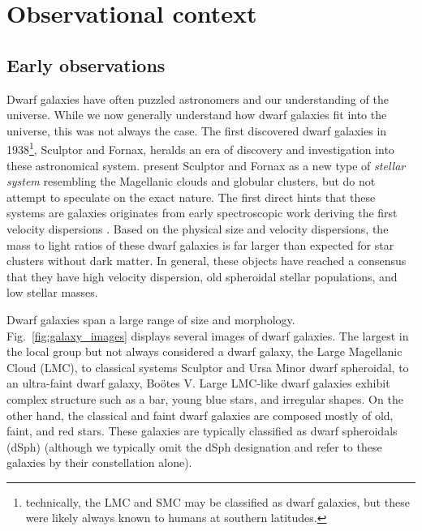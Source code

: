 \section{Observational context}\label{observational-context}

\subsection{Early observations}\label{early-observations}

Dwarf galaxies have often puzzled astronomers and our understanding of
the universe. While we now generally understand how dwarf galaxies fit
into the universe, this was not always the case. The first discovered
dwarf galaxies in 1938\footnote{technically, the LMC and SMC may be
  classified as dwarf galaxies, but these were likely always known to
  humans at southern latitudes.}, Sculptor and Fornax, heralds an era of
discovery and investigation into these astronomical system.
\citet{shapley1938} present Sculptor and Fornax as a new type of
\emph{stellar system} resembling the Magellanic clouds and globular
clusters, but do not attempt to speculate on the exact nature. The first
direct hints that these systems are galaxies originates from early
spectroscopic work deriving the first velocity dispersions
\citep[e.g.,][\citet{gallagher+wyse1994}, \citet{mateo1994},
\citet{pryor1994}, \citet{pryor1996}, \citet{gerhard1994}, and
\citet{olszewski1998}.]{aaronson1983}. Based on the physical size and
velocity dispersions, the mass to light ratios of these dwarf galaxies
is far larger than expected for star clusters without dark matter. In
general, these objects have reached a consensus that they have high
velocity dispersion, old spheroidal stellar populations, and low stellar
masses.

Dwarf galaxies span a large range of size and morphology.
Fig.~\ref{fig:galaxy_images} displays several images of dwarf galaxies.
The largest in the local group but not always considered a dwarf galaxy,
the Large Magellanic Cloud (LMC), to classical systems Sculptor and Ursa
Minor dwarf spheroidal, to an ultra-faint dwarf galaxy, Boötes V. Large
LMC-like dwarf galaxies exhibit complex structure such as a bar, young
blue stars, and irregular shapes. On the other hand, the classical and
faint dwarf galaxies are composed mostly of old, faint, and red stars.
These galaxies are typically classified as dwarf spheroidals (dSph)
(although we typically omit the dSph designation and refer to these
galaxies by their constellation alone).


